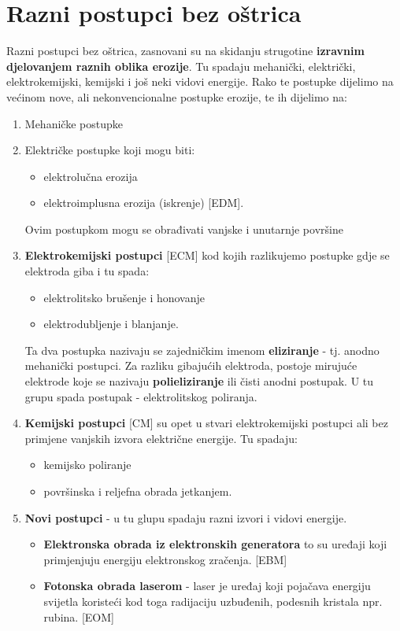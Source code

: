 \documentclass[a4paper,12pt]{article}
\numberwithin{figure}{section}
\begin{document}
\section{Razni postupci bez oštrica}
Razni postupci bez oštrica, zasnovani su na skidanju strugotine \textbf{izravnim djelovanjem raznih oblika erozije}. Tu spadaju mehanički, električki, elektrokemijski, kemijski i još neki vidovi energije. Rako te postupke dijelimo na većinom nove, ali nekonvencionalne postupke erozije, te ih dijelimo na:
\begin{enumerate}
\item Mehaničke postupke
\item Električke postupke koji mogu biti:
\begin{itemize}
\item elektrolučna erozija
\item elektroimplusna erozija (iskrenje) [EDM].
\end{itemize}
Ovim postupkom mogu se obrađivati vanjske i unutarnje površine
\item \textbf{Elektrokemijski postupci} [ECM] kod kojih razlikujemo postupke gdje se elektroda giba i tu spada:
\begin{itemize}
\item elektrolitsko brušenje i honovanje
\item elektrodubljenje i blanjanje.
\end{itemize}
Ta dva postupka nazivaju se zajedničkim imenom \textbf{eliziranje} - tj. anodno mehanički postupci. Za razliku gibajućih elektroda, postoje mirujuće elektrode koje se nazivaju \textbf{polieliziranje} ili čisti anodni postupak. U tu grupu spada postupak - elektrolitskog poliranja.
\item \textbf{Kemijski postupci} [CM] su opet u stvari elektrokemijski postupci ali bez primjene vanjskih izvora električne energije. Tu spadaju:
\begin{itemize}
\item kemijsko poliranje
\item površinska i reljefna obrada jetkanjem.
\end{itemize}
\item \textbf{Novi postupci} - u tu glupu spadaju razni izvori i vidovi energije.
\begin{itemize}
\item \textbf{Elektronska obrada iz elektronskih generatora} to su uređaji koji primjenjuju energiju elektronskog zračenja. [EBM]
\item \textbf{Fotonska obrada laserom} - laser je uređaj koji pojačava energiju svijetla koristeći kod toga radijaciju uzbuđenih, podesnih kristala npr. rubina. [EOM]

\end{itemize}
\end{enumerate}
\end{document}
